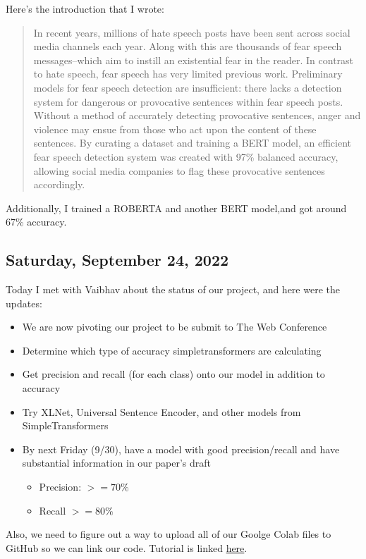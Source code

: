 \documentclass[11pt,letterpaper]{article}
\begin{document}
Here's the introduction that I wrote:
\begin{quote}
In recent years, millions of hate speech posts have been sent across social media channels each year. Along with this are thousands of fear speech messages–which aim to instill an existential fear in the reader. In contrast to hate speech, fear speech has very limited previous work. Preliminary models for fear speech detection are insufficient: there lacks a detection system for dangerous or provocative sentences within fear speech posts. Without a method of accurately detecting provocative sentences, anger and violence may ensue from those who act upon the content of these sentences. By curating a dataset and training a BERT model, an efficient fear speech detection system was created with 97\% balanced accuracy, allowing social media companies to flag these provocative sentences accordingly.
\end{quote}

Additionally, I trained a ROBERTA and another BERT model,and got around 67\% accuracy.

\subsection{Saturday, September 24, 2022}
Today I met with Vaibhav about the status of our project, and here were the updates:
\begin{itemize}
    \item We are now pivoting our project to be submit to The Web Conference
    \item Determine which type of accuracy simpletransformers are calculating
    \item Get precision and recall (for each class) onto our model in addition to accuracy
    \item Try XLNet, Universal Sentence Encoder, and other models from SimpleTransformers
    \item By next Friday (9/30), have a model with good precision/recall and have substantial information in our paper's draft
    \begin{itemize}
        \item Precision: $>= 70\%$
        \item Recall $>= 80\%$ 
    \end{itemize}
\end{itemize}

Also, we need to figure out a way to upload all of our Goolge Colab files to GitHub so we can link our code. Tutorial is linked \href{https://www.geeksforgeeks.org/how-to-upload-project-on-github-from-google-colab/}{here}.
\end{document}

